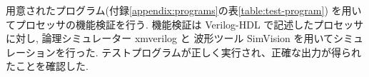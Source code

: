 \documentclass[../main.tex]{subfiles}
\begin{document}
  用意されたプログラム(付録\ref{appendix:programs}の表\ref{table:test-program})
  を用いてプロセッサの機能検証を行う.
  機能検証は Verilog-HDL で記述したプロセッサに対し, 
  論理シミュレーター xmverilog と
  波形ツール SimVision を用いてシミュレーションを行った.
  テストプログラムが正しく実行され、正確な出力が得られたことを確認した.
\end{document}
